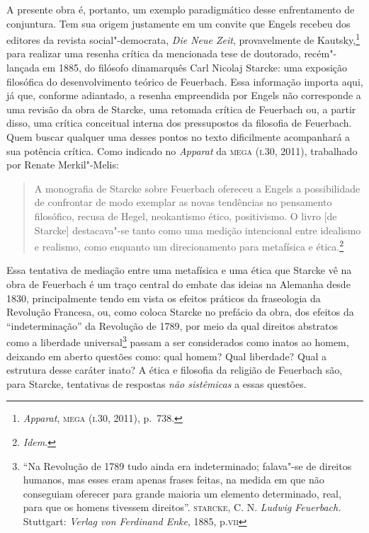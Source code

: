 A presente obra é, portanto, um exemplo paradigmático desse
enfrentamento de conjuntura. Tem sua origem justamente em um convite que
Engels recebeu dos editores da revista social"-democrata, \emph{Die
Neue Zeit}, provavelmente de Kautsky,\footnote{\emph{Apparat},
  \textsc{mega} (\textsc{i}.30, 2011), p.~738.} para realizar uma
resenha crítica da mencionada tese de doutorado, recém"-lançada em
1885, do filósofo dinamarquês Carl Nicolaj Starcke: uma exposição
filosófica do desenvolvimento teórico de Feuerbach. Essa informação
importa aqui, já que, conforme adiantado, a resenha empreendida por
Engels não corresponde a uma revisão da obra de Starcke, uma retomada
crítica de Feuerbach ou, a partir disso, uma crítica conceitual interna
dos pressupostos da filosofia de Feuerbach. Quem buscar qualquer uma
desses pontos no texto dificilmente acompanhará a sua potência crítica.
Como indicado no \emph{Apparat} da \textsc{mega} (\textsc{i}.30, 2011),
trabalhado por Renate Merkil"-Melis:

\begin{quote}
A monografia de Starcke sobre Feuerbach ofereceu a Engels a
possibilidade de confrontar de modo exemplar as novas tendências no
pensamento filosófico, recusa de Hegel, neokantismo ético, positivismo.
O livro {[}de Starcke{]} destacava"-se tanto como uma medição
intencional entre idealismo e realismo, como enquanto um direcionamento
para metafísica e ética.\footnote{\emph{Idem}.}
\end{quote}

Essa tentativa de mediação entre uma metafísica e uma ética que Starcke
vê na obra de Feuerbach é um traço central do embate das ideias na
Alemanha desde 1830, principalmente tendo em vista os efeitos práticos
da fraseologia da Revolução Francesa, ou, como coloca Starcke no prefácio
da obra, dos efeitos da ``indeterminação'' da Revolução de 1789, por
meio da qual direitos abstratos como a liberdade universal\footnote{``Na
  Revolução de 1789 tudo ainda era indeterminado; falava"-se de direitos
  humanos, mas esses eram apenas frases feitas, na medida em que não
  conseguiam oferecer para grande maioria um elemento determinado, real,
  para que os homens tivessem direitos''. \textsc{starcke}, C. N.
  \emph{Ludwig Feuerbach.} Stuttgart: \emph{Verlag von Ferdinand Enke},
  1885, p.\textsc{vii}} passam a ser considerados como inatos ao homem,
deixando em aberto questões como: qual homem? Qual liberdade? Qual a
estrutura desse caráter inato? A ética e filosofia da religião de
Feuerbach são, para Starcke, tentativas de respostas \emph{não
sistêmicas} a essas questões.

